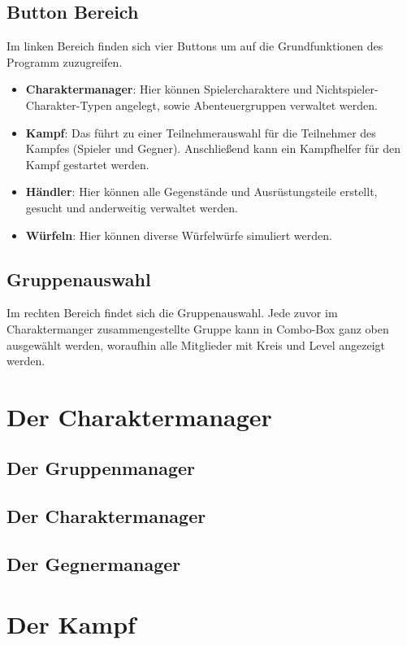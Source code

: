 \documentclass[11pt, a4paper, german]{article}
\begin{document}
\subsection{Button Bereich}
Im linken Bereich finden sich vier Buttons um auf die Grundfunktionen des Programm zuzugreifen.
\begin{itemize}
	\item[] \textbf{Charaktermanager}: Hier können Spielercharaktere und Nichtspieler-Charakter-Typen angelegt, sowie Abenteuergruppen verwaltet werden.
	\item[] \textbf{Kampf}: Das führt zu einer Teilnehmerauswahl für die Teilnehmer des Kampfes (Spieler und Gegner). Anschließend kann ein Kampfhelfer für den Kampf gestartet werden.
	\item[] \textbf{Händler}: Hier können alle Gegenstände und Ausrüstungsteile erstellt, gesucht und anderweitig verwaltet werden.
	\item[] \textbf{Würfeln}: Hier können diverse Würfelwürfe simuliert werden.
\end{itemize}

\subsection{Gruppenauswahl}
Im rechten Bereich findet sich die Gruppenauswahl. Jede zuvor im Charaktermanger zusammengestellte Gruppe kann in Combo-Box ganz oben ausgewählt werden, woraufhin alle Mitglieder mit Kreis und Level angezeigt werden.

\newpage

\section{Der Charaktermanager}
\subsection{Der Gruppenmanager}
\subsection{Der Charaktermanager}
\subsection{Der Gegnermanager}

\section{Der Kampf}
\end{document}
